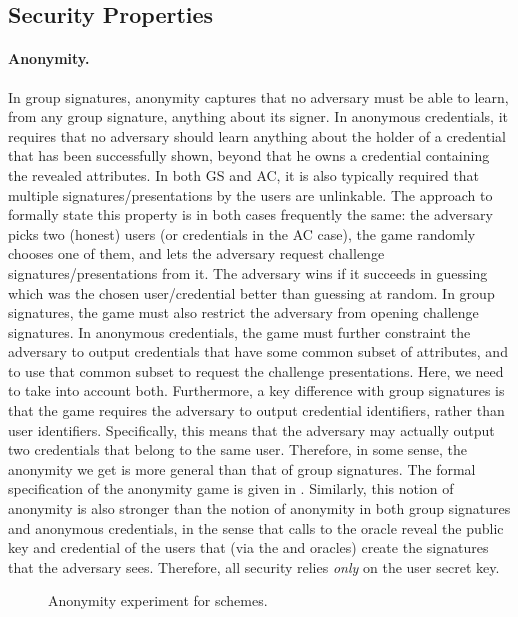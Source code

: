 \subsection{Security Properties}
\label{ssec:security}

\paragraph{Anonymity.} %
In group signatures, anonymity captures that no adversary must be able to learn,
from any group signature, anything about its signer. In anonymous credentials,
it requires that no adversary should learn anything about the holder of a
credential that has been successfully shown, beyond that he owns a credential
containing the revealed attributes. In both GS and AC, it is also typically
required that
multiple signatures/presentations by the users are unlinkable. The approach to
formally state this property is in both cases frequently the same: the adversary
picks two (honest) users (or credentials in the AC case), the game randomly
chooses one of them, and lets the adversary request challenge
signatures/presentations from it. The adversary wins if it succeeds in guessing
which was the chosen user/credential better than guessing at random. In group
signatures, the game must also restrict the adversary from opening challenge
signatures. In anonymous credentials, the game must further constraint the
adversary to output credentials that have some common subset of attributes, and
to use that common subset to request the challenge presentations. Here, we need
to take into account both. Furthermore, a key difference with group signatures
is that the game requires the adversary to output credential identifiers, rather
than user identifiers. Specifically, this means that the adversary may actually
output two credentials that belong to the same user. Therefore, in some sense,
the anonymity we get is more general than that of group signatures. The formal
specification of the anonymity game is given in .
%
Similarly, this notion of anonymity is also stronger than the notion of
anonymity in both group signatures and anonymous credentials, in the sense
that calls to the \OPEN oracle reveal the public key and credential of the users
that (via the \SIGN and \CHALb oracles) create the signatures that the adversary
sees. Therefore, all security relies \emph{only} on the user secret key.

\begin{figure}[htp!]
  \caption{Anonymity experiment for \GSAC schemes.}
  \label{fig:exp-gsac-anonb}
\end{figure}

